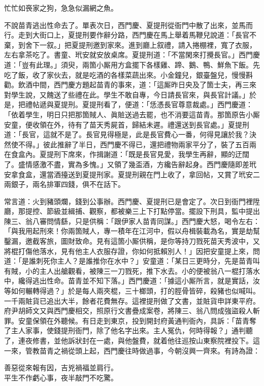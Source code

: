\begin{myquote}
忙忙如䘮家之狗，急急似漏網之魚。
\end{myquote}

不說苗青逃出性命去了。單表次日，西門慶、夏提刑從衙門中散了出來，並馬而行。走到大街口上，夏提刑要作辭分路，西門慶在馬上舉着馬鞭兒說道：「長官不棄，到舍下一叙。」把夏提刑邀到家來。進到廳上叙禮，請入捲棚裡，寬了衣服，左右拿茶吃了。書童、玳安就安放桌席。夏提刑道：「不當閑來打攪長官。」西門慶道：「豈有此理。」須臾，兩箇小厮用方盒擺下各樣雞、蹄、鵝、鴨、鮮魚下飯。先吃了飯，收了家伙去，就是吃酒的各樣菜蔬出來。小金鐘兒，銀臺盤兒，慢慢斟勸。飲酒中間，西門慶方題起苗青的事來，道：「這厮昨日央及了箇士夫，再三來對學生說，又餽送了些禮在此。學生不敢自專，今日請長官來，與長官計議。」於是，把禮帖遞與夏提刑。夏提刑看了，便道：「恁憑長官尊意裁處。」西門慶道：「依着學生，明日只把那箇賊人、眞賍送過去罷，也不消要這苗青。那箇原告小厮安童，便收領在外，待有了苗天秀屍首，歸結未遲。禮還送到長官處。」夏提刑道：「長官，這就不是了。長官見得極是，此是長官費心一番，何得見讓於我？決然使不得。」彼此推辭了半日，西門慶不得已，還把禮物兩家平分了，裝了五百兩在食盒內。夏提刑下席來，作揖謝道：「既是長官見愛，我學生再辭，顯的迂闊了。盛情感激不盡，實為多愧。」又領了幾盃酒，方纔告辭起身。西門慶隨即差玳安拿食盒，還當酒擡送到夏提刑家。夏提刑親在門上收了，拿回帖，又賞了玳安二兩銀子，兩名排軍四錢，俱不在話下。

常言道：火到豬頭爛，錢到公事辦。西門慶、夏提刑已是會定了。次日到衙門裡陞廳，那提控、節級並緝捕、觀察，都被樂三上下打點停當。擺設下刑具，監中提出陳三、翁八審問情繇，只是供稱：「跟伊家人苗青同謀。」西門慶大怒，喝令左右：「與我用起刑來！你兩箇賊人，專一積年在江河中，假以舟楫裝載為名，實是劫幫鑿漏，邀截客旅，圖財致命。見有這箇小厮供稱，是你等持刀戮死苗天秀波中，又將棍打傷他落水，見有他主人衣服存證，你如何抵賴別人！」因把安童提上來，問道：「是誰刺死你主人？是誰推你在水中？」安童道：「某日三更時分，先是苗青叫有賊，小的主人出艙觀看，被陳三一刀戮死，推下水去。小的便被翁八一棍打落水中，纔得逃出性命。苗青並不知下落。」西門慶道：「據這小厮所言，就是實話，汝等如何輾轉得過？」於是每人兩夾棍，三十榔頭，打的脛骨皆碎，殺豬也似喊叫。一千兩賍貨已追出大半，餘者花費無存。這裡提刑做了文書，並賍貨申詳東平府。府尹胡師文又與西門慶相交，照原行文書疊成案卷，將陳三、翁八問成強盜殺人斬罪。安童保領在外聽候。有日走到東京，投到開封府黃通判衙內，具訴：「苗青奪了主人家事，使錢提刑衙門，除了他名字出來。主人冤仇，何時得報？」通判聽了，連夜修書，並他訴狀封在一處，與他盤費，就着他往巡按山東察院裡投下。這一來，管教苗青之禍從頭上起，西門慶往時做過事，今朝沒興一齊來。有詩為證：

\begin{myquote}
善惡從來報有因，吉兇禍福並肩行。\\平生不作虧心事，夜半敲門不吃驚。
\end{myquote}


